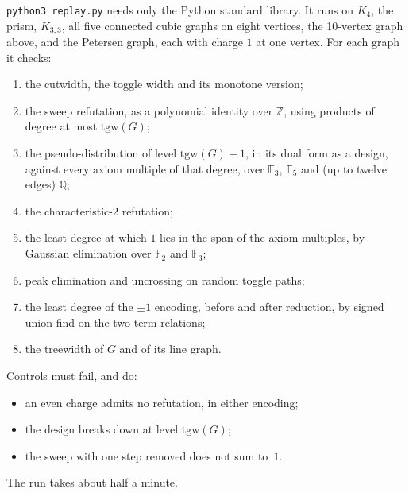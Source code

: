 \documentclass[11pt]{article}
\theoremstyle{definition}
\theoremstyle{remark}
\newcommand{\tgw}{\mathrm{tgw}}
\begin{document}
\texttt{python3 replay.py} needs only the Python standard library. It runs on
$K_4$, the prism, $K_{3,3}$, all five connected cubic graphs on eight
vertices, the 10-vertex graph above, and the Petersen graph, each with charge
$1$ at one vertex. For each graph it checks:
\begin{enumerate}
\item the cutwidth, the toggle width and its monotone version;
\item the sweep refutation, as a polynomial identity over $\mathbb Z$, using
products of degree at most $\tgw(G)$;
\item the pseudo-distribution of level $\tgw(G)-1$, in its dual form as a
design, against every axiom multiple of that degree, over $\mathbb F_3$,
$\mathbb F_5$ and (up to twelve edges) $\mathbb Q$;
\item the characteristic-$2$ refutation;
\item the least degree at which $1$ lies in the span of the axiom multiples,
by Gaussian elimination over $\mathbb F_2$ and $\mathbb F_3$;
\item peak elimination and uncrossing on random toggle paths;
\item the least degree of the $\pm1$ encoding, before and after reduction, by
signed union-find on the two-term relations;
\item the treewidth of $G$ and of its line graph.
\end{enumerate}
Controls must fail, and do:
\begin{itemize}
\item an even charge admits no refutation, in either encoding;
\item the design breaks down at level $\tgw(G)$;
\item the sweep with one step removed does not sum to~$1$.
\end{itemize}
The run takes about half a minute.
\end{document}
